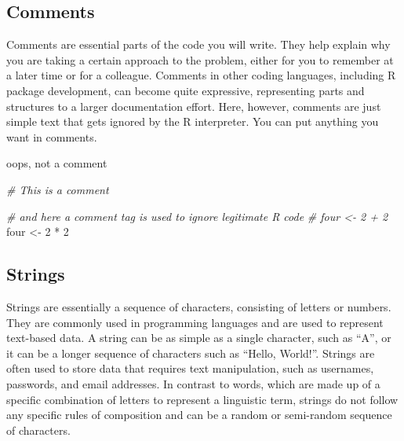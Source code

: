 \documentclass[
]{book}
\newenvironment{Shaded}{\begin{snugshade}}{\end{snugshade}}
\newcommand{\CommentTok}[1]{\textcolor[rgb]{0.56,0.35,0.01}{\textit{#1}}}
\newcommand{\DecValTok}[1]{\textcolor[rgb]{0.00,0.00,0.81}{#1}}
\newcommand{\NormalTok}[1]{#1}
\newcommand{\OtherTok}[1]{\textcolor[rgb]{0.56,0.35,0.01}{#1}}
\newcommand{\SpecialCharTok}[1]{\textcolor[rgb]{0.00,0.00,0.00}{#1}}
\begin{document}
\hfill\break

\hypertarget{comments}{%
\subsection{Comments}\label{comments}}

Comments are essential parts of the code you will write. They help explain why you are taking a certain approach to the problem, either for you to remember at a later time or for a colleague. Comments in other coding languages, including R package development, can become quite expressive, representing parts and structures to a larger documentation effort. Here, however, comments are just simple text that gets ignored by the R interpreter. You can put anything you want in comments.

\begin{Shaded}
\begin{Highlighting}[]
\NormalTok{oops, not a comment}
\end{Highlighting}
\end{Shaded}

\begin{Shaded}
\begin{Highlighting}[]
\CommentTok{\# This is a comment}

\CommentTok{\# and here a comment tag is used to ignore legitimate R code}
\CommentTok{\# four \textless{}{-} 2 + 2 }
\NormalTok{four }\OtherTok{\textless{}{-}} \DecValTok{2} \SpecialCharTok{*} \DecValTok{2}
\end{Highlighting}
\end{Shaded}

\hypertarget{strings}{%
\subsection{Strings}\label{strings}}

Strings are essentially a sequence of characters, consisting of letters or numbers. They are commonly used in programming languages and are used to represent text-based data. A string can be as simple as a single character, such as ``A'', or it can be a longer sequence of characters such as ``Hello, World!''. Strings are often used to store data that requires text manipulation, such as usernames, passwords, and email addresses. In contrast to words, which are made up of a specific combination of letters to represent a linguistic term, strings do not follow any specific rules of composition and can be a random or semi-random sequence of characters.
\end{document}
